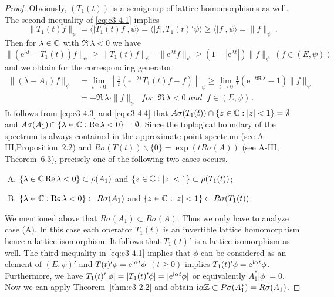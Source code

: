 \begin{proof}
	Obviously, $(T_{1}(t))$ is a semigroup of lattice homomorphisms as well. 
	The second inequality of \eqref{eq:c3-4.1} implies
	\begin{equation}\label{eq:c3-4.3}
	\|T_{1}(t)f\|_{\psi} = \langle|T_{1}(t)f|,\psi\rangle = \langle|f|,T_{1}(t)'\psi\rangle \geq \langle|f|,\psi\rangle = \|f\|_{\psi}\,.
	\end{equation}
	Then for $\lambda \in \mathbb{C} $ with $\Re\,\lambda < 0$ we have 
	\[ 
	\|(\mathrm{e}^{\lambda t}-T_{1}(t))f\|_{\psi} \geq \|T_{1}(t)f\|_{\psi}-\|\mathrm{e}^{\lambda t}f\|_{\psi} \geq (1-|\mathrm{e}^{\lambda t}|)\|f\|_{\psi} \ (f \in (E,\psi))
	\]
	and we obtain for the corresponding generator
	\begin{equation}\label{eq:c3-4.4}
		\begin{aligned}
		\|(\lambda-A_{1})f\|_{\psi} &= \lim_{t \to 0}\left\|\frac{1}{t}(\mathrm{e}^{-\lambda t}T_{1}(t)f-f)\right\|_{\psi} \geq \lim_{t \to 0}\frac{1}{t}(\mathrm{e}^{-t\Re\,\lambda}-1)\|f\|_{\psi}\\
		&= -\Re\,\lambda\cdot\|f\|_{\psi} \ \textit{ for } \ \Re\,\lambda < 0 \textit{ and } \ f \in (E,\psi)\,.
		\end{aligned}
	\end{equation}
	It follows from \eqref{eq:c3-4.3} and \eqref{eq:c3-4.4} that $A\sigma(T_{1}(t))\cap\{z \in \mathbb{C}  : |z| < 1\} = \emptyset$ and $A\sigma(A_{1})\cap\{\lambda \in \mathbb{C}  : \mathop{}\!\mathrm{Re}\,\lambda < 0\} = \emptyset$. 
	Since the toplogical boundary of the spectrum is always contained in the approximate point spectrum (see A-III,Proposition~2.2) and $R\sigma(T(t))\backslash\{0\} = \exp(tR\sigma(A))$ (see A-III, Theorem~6.3), precisely one of the following two cases occurs.
	\begin{enumerate}[(A)]
		\item
		$\{\lambda \in \mathbb{C}   \mathop{}\!\mathrm{Re}\,\lambda < 0\} \subset \rho(A_{1})$ and $\{z \in \mathbb{C}  : |z| < 1\} \subset \rho(T_{1}(t))$;
		
		\item
		$\{\lambda \in \mathbb{C}  : \mathop{}\!\mathrm{Re}\,\lambda < 0\} \subset R\sigma(A_{1})$ and $\{z \in \mathbb{C}  : |z| < 1\} \subset R\sigma(T_{1}(t))$.
	\end{enumerate}
	
	We mentioned above that $R\sigma(A_{1}) \subset R\sigma(A)$. 
	Thus we only have to analyze case (A). 
	In this case each operator $T_{1}(t)$ is an invertible lattice homomorphism hence a lattice isomorphism. 
	It follows that $T_{1}(t)'$ is a lattice isomorphism as well. 
	The third inequality in \eqref{eq:c3-4.1} implies that $\phi$ can be considered as an element of $(E,\psi)'$ and $T(t)'\phi = \mathrm{e}^{\mathrm{i}\alpha t}\phi$ $(t \geq 0)$ implies $T_{1}(t)'\phi = \mathrm{e}^{\mathrm{i}\alpha t}\phi$. 
	Furthermore, we have
	$T_{1}(t)'|\phi| = |T_{1}(t)'\phi| = |\mathrm{e}^{\mathrm{i}\alpha t}\phi|$ or equivalently $A_{1}^*|\phi| = 0$.
	Now we can apply 
	Theorem~\ref{thm:c3-2.2} 
	and obtain $\mathrm{i}\alpha\mathbb{Z} \subset P\sigma(A_{1}^*) = R\sigma(A_{1})$.
	\end{proof}

